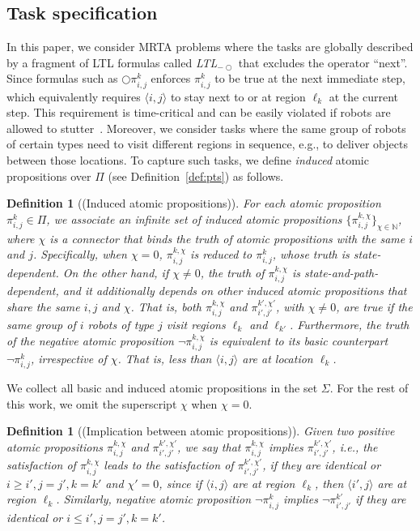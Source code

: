 \documentclass[Afour,sageh,times]{sagej}
\newtheorem{defn}[thm]{Definition}
\newcommand{\ltl}{ {\it LTL}$_{-\bigcirc}$ }
\newcommand{\ag}[2]{\langle#1,#2\rangle}
\newcommand{\simplies}{\DOTSB\Longrightarrow}
\renewcommand{\ap}[3]{\mathcal{\pi}_{{#1},{#2}}^{#3}}
\begin{document}
\subsection{Task specification}
In this paper, we consider MRTA problems where the tasks are globally described by  a fragment of LTL formulas called \ltl that excludes the operator ``next''. Since formulas such as  $\bigcirc \ap{i}{j}{k}$ enforces $\ap{i}{j}{k}$ to be true at the next immediate step, which equivalently requires $\langle i,j \rangle$ to stay next to or at region $\ell_k$ at the current step. This requirement  is time-critical and can be easily violated if robots are allowed to stutter~\citep{sahin2019multirobot}. Moreover, we consider tasks where the same group of robots of certain types  need to visit different regions in sequence, e.g., to deliver objects between those locations. To capture such tasks, we  define {\it induced} atomic propositions over $\Pi$ (see Definition~\ref{def:pts})  as follows.


\begin{defn}[(Induced atomic propositions)]
   For each atomic proposition $\ap{i}{j}{k} \in \Pi$, we associate an infinite set of  {induced} atomic propositions $\{\ap{i}{j}{k,\chi}\}_{\chi\in \mathbb{N}}$, where $\chi$ is a {\it connector} that binds the truth of  atomic propositions with the same $i$ and $j$. Specifically, when $\chi=0$, $\ap{i}{j}{k,\chi}$ is reduced to $\ap{i}{j}{k}$, whose truth is state-dependent. On the other hand, if $\chi \neq 0$, the truth of $\ap{i}{j}{k,\chi}$ is state-and-path-dependent, and it additionally depends on other induced atomic propositions that share the same $i,j$ and $\chi$. That is, both $\ap{i}{j}{k,\chi}$ and $\ap{i'}{j'}{k',\chi'}$, with $\chi\not=0$, are true if the same group of $i$ robots of type $j$ visit regions $\ell_k$ and $\ell_{k'}$. Furthermore, the truth of the negative atomic proposition  $\neg \ap{i}{j}{k,\chi}$ is equivalent to its basic counterpart $\neg \ap{i}{j}{k}$, irrespective of  $\chi$. That is, less than $\ag{i}{j}$ are at location $\ell_k$.
\end{defn}
We collect all basic and induced atomic propositions in the set $\Sigma$.  For the rest of this work, we omit the superscript $\chi$ when $\chi=0$.
\begin{defn}[(Implication between atomic propositions)]\label{defn:literalimplication}
  Given two positive atomic propositions $\ap{i}{j}{k,\chi}$ and $\ap{i'}{j'}{k',\chi'}$, we say that $\ap{i}{j}{k,\chi}$ implies $\ap{i'}{j'}{k',\chi'}$, i.e., the satisfaction of $\ap{i}{j}{k,\chi}$ leads to the satisfaction of $\ap{i'}{j'}{k',\chi'}$,
  if they are identical or $i\geq i', j= j', k=k'$ and $\chi'=0$,  since if $\ag{i}{j}$ are at region $\ell_k$, then $\ag{i'}{j}$ are at region $\ell_k$.   Similarly, negative atomic proposition $\neg \ap{i}{j}{k}$ implies $\neg \ap{i'}{j'}{k'}$ if they are identical or $i\leq i', j= j', k=k'$.
\end{defn}
\end{document}

